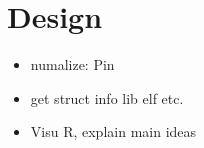 
\section{Design}
\label{sec:design}
\begin{itemize}
    \item numalize: Pin \cite{Luk05Pin}
    \item get struct info lib elf etc.
    \item Visu R, explain main ideas
\end{itemize}
